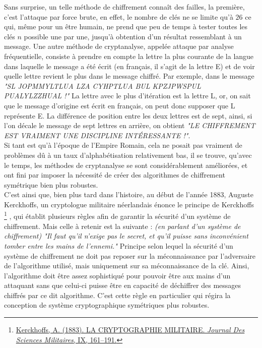 \documentclass{article}
\begin{document}
\newpage

Sans surprise, un telle méthode de chiffrement connaît des failles, la première, c'est l'attaque par force brute, en effet, le nombre de clés ne se limite qu'à $26$ ce qui, même pour un être humain, ne prend que peu de temps à tester toutes les clés $n$ possible une par une, jusqu'à obtention d'un résultat ressemblant à un message. Une autre méthode de cryptanalyse, appelée attaque par analyse fréquentielle, consiste à prendre en compte la lettre la plus courante de la langue dans laquelle le message a été écrit (en français, il s'agit de la lettre E) et de voir quelle lettre revient le plus dans le message chiffré. Par exemple, dans le message \textit{"SL JOPMMYLTLUA LZA CYHPTLUA BUL KPZJPWSPUL PUALYLZZHUAL !"} La lettre avec le plus d'itération est la lettre L, or, on sait que le message d'origine est écrit en français, on peut donc supposer que L représente E. La différence de position entre les deux lettres est de sept, ainsi, si l'on décale le message de sept lettres en arrière, on obtient \textit{"LE CHIFFREMENT EST VRAIMENT UNE DISCIPLINE INTÉRESSANTE !"}. \\

Si tant est qu'à l'époque de l'Empire Romain, cela ne posait pas vraiment de problèmes dû à un taux d'alphabétisation relativement bas, il se trouve, qu'avec le temps, les méthodes de cryptanalyse se sont considérablement améliorées, et ont fini par imposer la nécessité de créer des algorithmes de chiffrement symétrique bien plus robustes. \\

C'est ainsi que, bien plus tard dans l'histoire, au début de l'année 1883, Auguste Kerckhoffs, un cryptologue militaire néerlandais énonce le principe de Kerckhoffs 
\footnote{\href{https://www.petitcolas.net/kerckhoffs/crypto_militaire_1.pdf}{Kerckhoffs, A. (1883). LA CRYPTOGRAPHIE MILITAIRE. \textit{Journal Des Sciences Militaires}, IX, 161–191.}}
, qui établit plusieurs règles afin de garantir la sécurité d'un système de chiffrement. Mais celle à retenir est la suivante : \textit{(en parlant d'un système de chiffrement) "Il faut qu’il n’exige pas le secret, et qu’il puisse sans inconvénient tomber entre les mains de l’ennemi."} Principe selon lequel la sécurité d'un système de chiffrement ne doit pas reposer sur la méconnaissance par l'adversaire de l'algorithme utilisé, mais uniquement sur sa méconnaissance de la clé. Ainsi, l'algorithme doit être assez sophistiqué pour pouvoir être aux mains d'un attaquant sans que celui-ci puisse être en capacité de déchiffrer des messages chiffrés par ce dit algorithme. C'est cette règle en particulier qui régira la conception de système cryptographique symétriques plus robustes.
\end{document}
